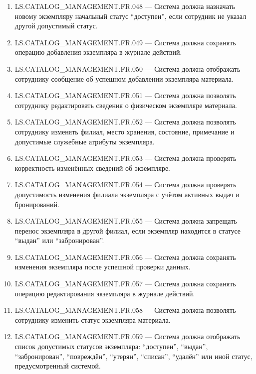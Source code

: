 \documentclass[12pt,a4paper]{article}
\begin{document}
\begin{enumerate}
		\item LS.CATALOG\_MANAGEMENT.FR.048 --- Система должна назначать новому экземпляру
		начальный статус ``доступен'', если сотрудник не указал другой допустимый статус.
		
		\item LS.CATALOG\_MANAGEMENT.FR.049 --- Система должна сохранять операцию
		добавления экземпляра в журнале действий.
		
		\item LS.CATALOG\_MANAGEMENT.FR.050 --- Система должна отображать сотруднику
		сообщение об успешном добавлении экземпляра материала.
		
		\item LS.CATALOG\_MANAGEMENT.FR.051 --- Система должна позволять сотруднику
		редактировать сведения о физическом экземпляре материала.
		
		\item LS.CATALOG\_MANAGEMENT.FR.052 --- Система должна позволять сотруднику
		изменять филиал, место хранения, состояние, примечание и допустимые служебные
		атрибуты экземпляра.
		
		\item LS.CATALOG\_MANAGEMENT.FR.053 --- Система должна проверять корректность
		изменённых сведений об экземпляре.
		
		\item LS.CATALOG\_MANAGEMENT.FR.054 --- Система должна проверять допустимость
		изменения филиала экземпляра с учётом активных выдач и бронирований.
		
		\item LS.CATALOG\_MANAGEMENT.FR.055 --- Система должна запрещать перенос
		экземпляра в другой филиал, если экземпляр находится в статусе ``выдан'' или
		``забронирован''.
		
		\item LS.CATALOG\_MANAGEMENT.FR.056 --- Система должна сохранять изменения
		экземпляра после успешной проверки данных.
		
		\item LS.CATALOG\_MANAGEMENT.FR.057 --- Система должна сохранять операцию
		редактирования экземпляра в журнале действий.
		
		\item LS.CATALOG\_MANAGEMENT.FR.058 --- Система должна позволять сотруднику
		изменить статус экземпляра материала.
		
		\item LS.CATALOG\_MANAGEMENT.FR.059 --- Система должна отображать список допустимых
		статусов экземпляра: ``доступен'', ``выдан'', ``забронирован'', ``повреждён'',
		``утерян'', ``списан'', ``удалён'' или иной статус, предусмотренный системой.
		

\end{enumerate}
\end{document}
